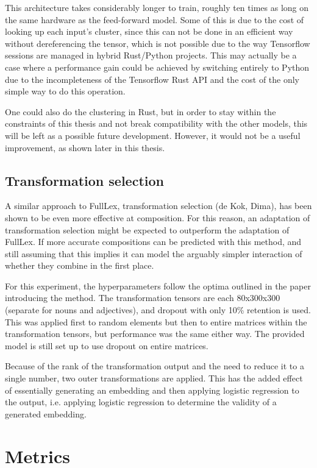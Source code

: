 \documentclass[a4paper, 11pt]{scrartcl}
\begin{document}
This architecture takes considerably longer to train, roughly ten times as long on the same hardware as the feed-forward model. Some of this is due to the cost of looking up each input's cluster, since this can not be done in an efficient way without dereferencing the tensor, which is not possible due to the way Tensorflow sessions are managed in hybrid Rust/Python projects. This may actually be a case where a performance gain could be achieved by switching entirely to Python due to the incompleteness of the Tensorflow Rust API and the cost of the only simple way to do this operation.

One could also do the clustering in Rust, but in order to stay within the constraints of this thesis and not break compatibility with the other models, this will be left as a possible future development. However, it would not be a useful improvement, as shown later in this thesis.

\subsection{Transformation selection}
A similar approach to FullLex, transformation selection (de Kok, Dima), has been shown to be even more effective at composition. For this reason, an adaptation of transformation selection might be expected to outperform the adaptation of FullLex. If more accurate compositions can be predicted with this method, and still assuming that this implies it can model the arguably simpler interaction of whether they combine in the first place.

For this experiment, the hyperparameters follow the optima outlined in the paper introducing the method. The transformation tensors are each 80x300x300 (separate for nouns and adjectives), and dropout with only 10\% retention is used. This was applied first to random elements but then to entire matrices within the transformation tensors, but performance was the same either way. The provided model is still set up to use dropout on entire matrices.

Because of the rank of the transformation output and the need to reduce it to a single number, two outer transformations are applied. This has the added effect of essentially generating an embedding and then applying logistic regression to the output, i.e. applying logistic regression to determine the validity of a generated embedding.


\section{Metrics}
\end{document}
